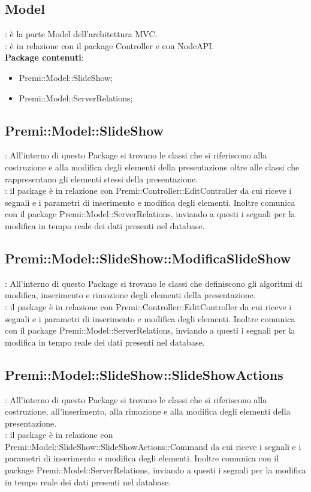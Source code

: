 \subsection{Model}{
	\textbf{\tipo}: è la parte Model dell'architettura MVC.\\
	\textbf{\relaz}: è in relazione con il package Controller e con NodeAPI.\\
	\textbf{Package contenuti}: 
	\begin{itemize}
	\item Premi::Model::SlideShow;
    \item Premi::Model::ServerRelations;
	\end{itemize}
}
\subsection{Premi::Model::SlideShow}{
		\textbf{\tipo}: All’interno di questo Package si trovano le classi che si riferiscono alla costruzione e alla modifica degli elementi della presentazione oltre alle classi che rappresentano gli elementi stessi della presentazione.\\
        \textbf{\relaz}: il package è in relazione con Premi::Controller::EditController da cui riceve i segnali e i parametri di inserimento e modifica degli elementi. Inoltre comunica con il package Premi::Model::ServerRelations, inviando a questi i segnali per la modifica in tempo reale dei dati presenti nel database.\\
    }
\subsection{Premi::Model::SlideShow::ModificaSlideShow}{
		\textbf{\tipo}: All’interno di questo Package si trovano le classi che definiscono gli algoritmi di modifica, inserimento e rimozione degli elementi della presentazione.\\
        \textbf{\relaz}: il package è in relazione con Premi::Controller::EditController da cui riceve i segnali e i parametri di inserimento e modifica degli elementi. Inoltre comunica con il package Premi::Model::ServerRelations, inviando a questi i segnali per la modifica in tempo reale dei dati presenti nel database.\\
    }
\subsection{Premi::Model::SlideShow::SlideShowActions}{
		\textbf{\tipo}: All’interno di questo Package si trovano le classi che si riferiscono alla costruzione, all'inserimento, alla rimozione e alla modifica degli elementi della presentazione.\\
        \textbf{\relaz}: il package è in relazione con Premi::Model::SlideShow::SlideShowActions::Command da cui riceve i segnali e i parametri di inserimento e modifica degli elementi. Inoltre comunica con il package Premi::Model::ServerRelations, inviando a questi i segnali per la modifica in tempo reale dei dati presenti nel database.\\
    }
    

